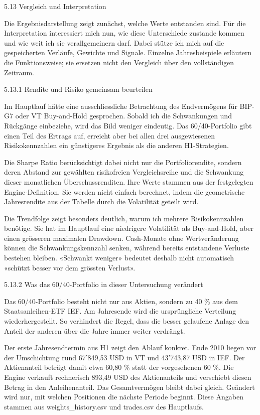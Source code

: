 \documentclass[
  ngerman,
  a4paper,
  DIV=11,
  oneside]{scrreprt}
\begin{document}
5.13 Vergleich und Interpretation

Die Ergebnisdarstellung zeigt zunächst, welche Werte entstanden sind.
Für die Interpretation interessiert mich nun, wie diese Unterschiede
zustande kommen und wie weit ich sie verallgemeinern darf. Dabei stütze
ich mich auf die gespeicherten Verläufe, Gewichte und Signale. Einzelne
Jahresbeispiele erläutern die Funktionsweise; sie ersetzen nicht den
Vergleich über den vollständigen Zeitraum.

5.13.1 Rendite und Risiko gemeinsam beurteilen

Im Hauptlauf hätte eine ausschliessliche Betrachtung des Endvermögens
für BIP-G7 oder VT Buy-and-Hold gesprochen. Sobald ich die Schwankungen
und Rückgänge einbeziehe, wird das Bild weniger eindeutig. Das
60/40-Portfolio gibt einen Teil des Ertrags auf, erreicht aber bei allen
drei ausgewiesenen Risikokennzahlen ein günstigeres Ergebnis als die
anderen H1-Strategien.

Die Sharpe Ratio berücksichtigt dabei nicht nur die Portfoliorendite,
sondern deren Abstand zur gewählten risikofreien Vergleichsreihe und die
Schwankung dieser monatlichen Überschussrenditen. Ihre Werte stammen aus
der festgelegten Engine-Definition. Sie werden nicht einfach berechnet,
indem die geometrische Jahresrendite aus der Tabelle durch die
Volatilität geteilt wird.

Die Trendfolge zeigt besonders deutlich, warum ich mehrere
Risikokennzahlen benötige. Sie hat im Hauptlauf eine niedrigere
Volatilität als Buy-and-Hold, aber einen grösseren maximalen Drawdown.
Cash-Monate ohne Wertveränderung können die Schwankungskennzahl senken,
während bereits entstandene Verluste bestehen bleiben. «Schwankt
weniger» bedeutet deshalb nicht automatisch «schützt besser vor dem
grössten Verlust».

5.13.2 Was das 60/40-Portfolio in dieser Untersuchung verändert

Das 60/40-Portfolio besteht nicht nur aus Aktien, sondern zu 40 \% aus
dem Staatsanleihen-ETF IEF. Am Jahresende wird die ursprüngliche
Verteilung wiederhergestellt. So verhindert die Regel, dass die besser
gelaufene Anlage den Anteil der anderen über die Jahre immer weiter
verdrängt.

Der erste Jahresendtermin aus H1 zeigt den Ablauf konkret. Ende 2010
liegen vor der Umschichtung rund 67'849,53 USD in VT und 43'743,87 USD
in IEF. Der Aktienanteil beträgt damit etwa 60,80 \% statt der
vorgesehenen 60 \%. Die Engine verkauft rechnerisch 893,49 USD des
Aktienanteils und verschiebt diesen Betrag in den Anleihenanteil. Das
Gesamtvermögen bleibt dabei gleich. Geändert wird nur, mit welchen
Positionen die nächste Periode beginnt. Diese Angaben stammen aus
weights\_history.csv und trades.csv des Hauptlaufs.
\end{document}
